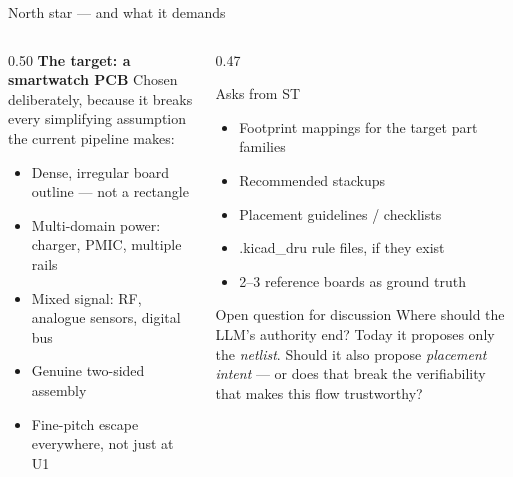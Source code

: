 \documentclass[aspectratio=169,10pt]{beamer}
\newcommand{\code}[1]{{\ttfamily\small #1}}
\begin{document}
\begin{frame}{North star --- and what it demands}
\vspace{1mm}
\begin{columns}[T]
\begin{column}{0.50\textwidth}
\textbf{The target: a smartwatch PCB}
\vspace{2mm}
\small Chosen deliberately, because it breaks every simplifying assumption the current pipeline makes:
\begin{itemize}\small
  \item Dense, irregular board outline --- not a rectangle
  \item Multi-domain power: charger, PMIC, multiple rails
  \item Mixed signal: RF, analogue sensors, digital bus
  \item Genuine two-sided assembly
  \item Fine-pitch escape everywhere, not just at U1
\end{itemize}
\end{column}
\begin{column}{0.47\textwidth}
\begin{block}{Asks from ST}
\small
\begin{itemize}\footnotesize
  \item Footprint mappings for the target part families
  \item Recommended stackups
  \item Placement guidelines / checklists
  \item \code{.kicad\_dru} rule files, if they exist
  \item 2--3 reference boards as ground truth
\end{itemize}
\end{block}
\vspace{1mm}
\begin{block}{Open question for discussion}
\small
Where should the LLM's authority end? Today it proposes only the \emph{netlist}. Should it also propose \emph{placement intent} --- or does that break the verifiability that makes this flow trustworthy?
\end{block}
\end{column}
\end{columns}
\end{frame}
\end{document}
